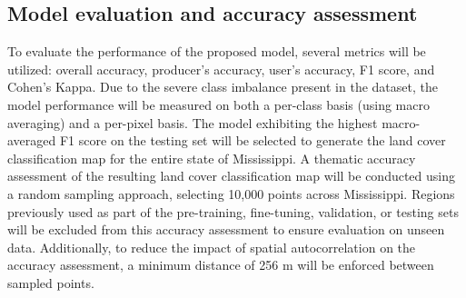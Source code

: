 \subsection{Model evaluation and accuracy assessment}
To evaluate the performance of the proposed model, several metrics will be utilized: overall accuracy, producer's accuracy, user's accuracy, F1 score, and Cohen's Kappa.
Due to the severe class imbalance present in the dataset, the model performance will be measured on both a per-class basis (using macro averaging) and a per-pixel basis.
The model exhibiting the highest macro-averaged F1 score on the testing set will be selected to generate the land cover classification map for the entire state of Mississippi.
A thematic accuracy assessment of the resulting land cover classification map will be conducted using a random sampling approach, selecting 10,000 points across Mississippi.
Regions previously used as part of the pre-training, fine-tuning, validation, or testing sets will be excluded from this accuracy assessment to ensure evaluation on unseen data.
Additionally, to reduce the impact of spatial autocorrelation on the accuracy assessment, a minimum distance of 256 m will be enforced between sampled points.